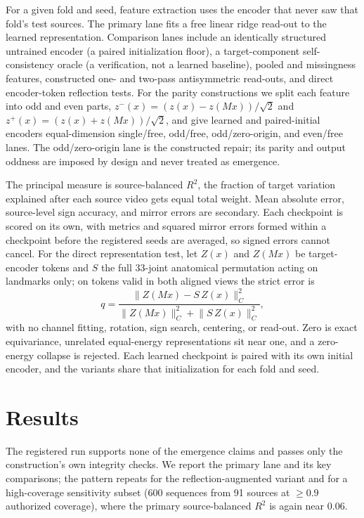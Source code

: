 \documentclass{article}
\begin{document}
For a given fold and seed, feature extraction uses the encoder that never saw that fold's test sources. The primary lane fits a free linear ridge read-out to the learned representation. Comparison lanes include an identically structured untrained encoder (a paired initialization floor), a target-component self-consistency oracle (a verification, not a learned baseline), pooled and missingness features, constructed one- and two-pass antisymmetric read-outs, and direct encoder-token reflection tests. For the parity constructions we split each feature into odd and even parts, $z^-(x)=(z(x)-z(Mx))/\sqrt{2}$ and $z^+(x)=(z(x)+z(Mx))/\sqrt{2}$, and give learned and paired-initial encoders equal-dimension single/free, odd/free, odd/zero-origin, and even/free lanes. The odd/zero-origin lane is the constructed repair; its parity and output oddness are imposed by design and never treated as emergence.

The principal measure is source-balanced $R^2$, the fraction of target variation explained after each source video gets equal total weight. Mean absolute error, source-level sign accuracy, and mirror errors are secondary. Each checkpoint is scored on its own, with metrics and squared mirror errors formed within a checkpoint before the registered seeds are averaged, so signed errors cannot cancel. For the direct representation test, let $Z(x)$ and $Z(Mx)$ be target-encoder tokens and $S$ the full 33-joint anatomical permutation acting on landmarks only; on tokens valid in both aligned views the strict error is
\[
q=\frac{\lVert Z(Mx)-S\,Z(x)\rVert_C^2}{\lVert Z(Mx)\rVert_C^2+\lVert S\,Z(x)\rVert_C^2},
\]
with no channel fitting, rotation, sign search, centering, or read-out. Zero is exact equivariance, unrelated equal-energy representations sit near one, and a zero-energy collapse is rejected. Each learned checkpoint is paired with its own initial encoder, and the variants share that initialization for each fold and seed.

\section{Results}
\label{sec:results}

The registered run supports none of the emergence claims and passes only the construction's own integrity checks. We report the primary lane and its key comparisons; the pattern repeats for the reflection-augmented variant and for a high-coverage sensitivity subset (600 sequences from 91 sources at $\geq 0.9$ authorized coverage), where the primary source-balanced $R^2$ is again near $0.06$.
\end{document}
